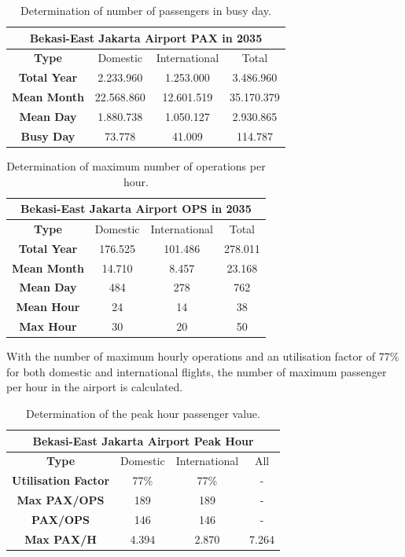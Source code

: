 \begin{table}[ht!]
	\label{table:'BusyDayPAX'}
	\centering
	\begin{tabular}{|c|c|c|c|}
		\hline 
		\multicolumn{4}{|c|}{\textbf{Bekasi-East Jakarta Airport PAX in 2035}}\tabularnewline
		\hline 
		\textbf{Type} & Domestic & International & Total\tabularnewline
		\hline 
		\textbf{Total Year} & 2.233.960  & 1.253.000  & 3.486.960 \tabularnewline
		\hline 
		\textbf{Mean Month} & 22.568.860  & 12.601.519  & 35.170.379 \tabularnewline
		\hline 
		\textbf{Mean Day} & 1.880.738  & 1.050.127  & 2.930.865 \tabularnewline
		\hline 
		\textbf{Busy Day} & 73.778  & 41.009  & 114.787 \tabularnewline
		\hline 
	\end{tabular}
	\caption{Determination of number of passengers in busy day.}
\end{table}

\begin{table}[ht!]
	\label{table:'BusyDayOPS'}
	\centering
	\begin{tabular}{|c|c|c|c|}
		\hline 
		\multicolumn{4}{|c|}{\textbf{Bekasi-East Jakarta Airport OPS in 2035}}\tabularnewline
		\hline 
		\textbf{Type} & Domestic & International & Total\tabularnewline
		\hline 
		\textbf{Total Year} & 176.525  & 101.486  & 278.011 \tabularnewline
		\hline 
		\textbf{Mean Month} & 14.710  & 8.457  & 23.168 \tabularnewline
		\hline 
		\textbf{Mean Day} & 484  & 278  & 762 \tabularnewline
		\hline 
		\textbf{Mean Hour} & 24  & 14  & 38 \tabularnewline
		\hline 
		\textbf{Max Hour} & 30  & 20  & 50 \tabularnewline
		\hline 
	\end{tabular}
	\caption{Determination of maximum number of operations per hour.}
\end{table}

With the number of maximum hourly operations and an utilisation factor of 77\% for both domestic and international flights, the number of maximum passenger per hour in the airport is calculated.

\begin{table}[ht!]
	\label{table:'PAXperhour'}
	\centering
\begin{tabular}{|c|c|c|c|}
	\hline 
	\multicolumn{4}{|c|}{\textbf{Bekasi-East Jakarta Airport Peak Hour}}\tabularnewline
	\hline 
	\textbf{Type} & Domestic & International & All\tabularnewline
	\hline 
	\textbf{Utilisation Factor} & 77\% & 77\% & -\tabularnewline
	\hline 
	\textbf{Max PAX/OPS} & 189 & 189 & -\tabularnewline
	\hline 
	\textbf{PAX/OPS} & 146 & 146 & -\tabularnewline
	\hline 
	\textbf{Max PAX/H} & 4.394 & 2.870 & 7.264\tabularnewline
	\hline 
\end{tabular}
\caption{Determination of the peak hour passenger value.}
\end{table}

	
	